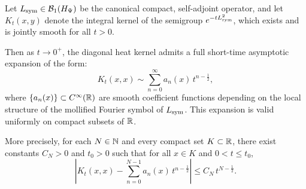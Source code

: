 \begin{lemma}
\label{lem:hk_expansion_uniform}
Let \( L_{\mathrm{sym}} \in \mathcal{B}_1(H_{\Psi}) \) be the canonical compact, self-adjoint operator, and let \( K_t(x,y) \) denote the integral kernel of the semigroup \( e^{-t L_{\mathrm{sym}}^2} \), which exists and is jointly smooth for all \( t > 0 \).

Then as \( t \to 0^+ \), the diagonal heat kernel admits a full short-time asymptotic expansion of the form:
\[
K_t(x,x) \sim \sum_{n=0}^\infty a_n(x)\, t^{n - \frac{1}{2}},
\]
where \( \{ a_n(x) \} \subset C^\infty(\mathbb{R}) \) are smooth coefficient functions depending on the local structure of the mollified Fourier symbol of \( L_{\mathrm{sym}} \). This expansion is valid uniformly on compact subsets of \( \mathbb{R} \).

More precisely, for each \( N \in \mathbb{N} \) and every compact set \( K \subset \mathbb{R} \), there exist constants \( C_N > 0 \) and \( t_0 > 0 \) such that for all \( x \in K \) and \( 0 < t \le t_0 \),
\[
\left| K_t(x,x) - \sum_{n=0}^{N-1} a_n(x)\, t^{n - \frac{1}{2}} \right| \le C_N\, t^{N - \frac{1}{2}}.
\]
\end{lemma}
